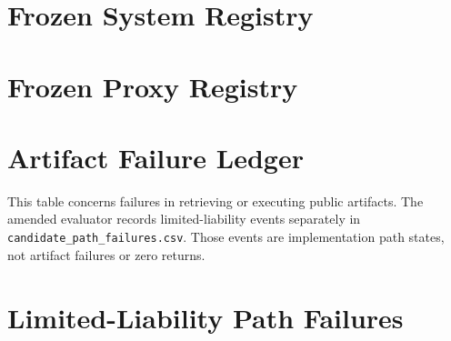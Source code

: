 \documentclass[11pt]{article}
\begin{document}
\clearpage
\begin{appendices}

\section{Frozen System Registry}\label{app:registry}

\begin{landscape}
\end{landscape}

\section{Frozen Proxy Registry}\label{app:candidates}

\begin{landscape}
\end{landscape}

\section{Artifact Failure Ledger}\label{app:failures}

\begin{landscape}
\end{landscape}

This table concerns failures in retrieving or executing public artifacts. The amended evaluator records limited-liability events separately in \texttt{candidate\_path\_failures.csv}. Those events are implementation path states, not artifact failures or zero returns.

\section{Limited-Liability Path Failures}\label{app:path-failures}

\begin{landscape}
\end{landscape}


\end{appendices}
\end{document}

